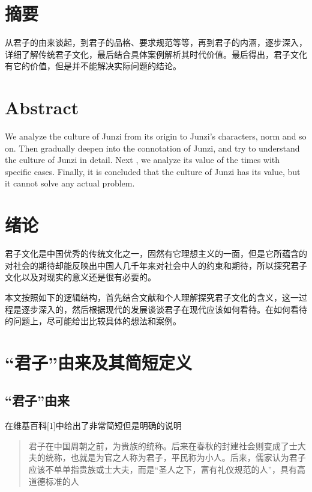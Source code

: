 \documentclass[]{article}
\date{}
\begin{document}
\hypertarget{header-n0}{%
\section{摘要}\label{header-n0}}

从君子的由来谈起，到君子的品格、要求规范等等，再到君子的内涵，逐步深入，详细了解传统君子文化，最后结合具体案例解析其时代价值。最后得出，君子文化有它的价值，但是并不能解决实际问题的结论。

\hypertarget{header-n4}{%
\section{Abstract}\label{header-n4}}

We analyze the culture of Junzi from its origin to Junzi's characters,
norm and so on. Then gradually deepen into the connotation of Junzi, and
try to understand the culture of Junzi in detail. Next , we analyze its
value of the times with specific cases. Finally, it is concluded that
the culture of Junzi has its value, but it cannot solve any actual
problem.

\hypertarget{header-n7}{%
\section{绪论}\label{header-n7}}

君子文化是中国优秀的传统文化之一，固然有它理想主义的一面，但是它所蕴含的对社会的期待却能反映出中国人几千年来对社会中人的约束和期待，所以探究君子文化以及对现实的意义还是很有必要的。

本文按照如下的逻辑结构，首先结合文献和个人理解探究君子文化的含义，这一过程是逐步深入的，然后根据现代的发展谈谈君子在现代应该如何看待。在如何看待的问题上，尽可能给出比较具体的想法和案例。

\hypertarget{header-n12}{%
\section{``君子''由来及其简短定义}\label{header-n12}}

\hypertarget{header-n13}{%
\subsection{``君子''由来}\label{header-n13}}

在维基百科{[}1{]}中给出了非常简短但是明确的说明

\begin{quote}
君子在中国周朝之前，为贵族的统称。后来在春秋的封建社会则变成了士大夫的统称，也就是为官之人称为君子，平民称为小人。后来，儒家认为君子应该不单单指贵族或士大夫，而是``圣人之下，富有礼仪规范的人''，具有高道德标准的人
\end{quote}
\end{document}
